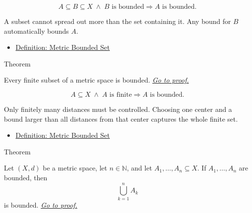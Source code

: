 \begin{remark*}
\[
A\subseteq B\subseteq X
\;\land\;
B\text{ is bounded}
\Longrightarrow
A\text{ is bounded}.
\]
\end{remark*}

\begin{remark*}[Interpretation]
A subset cannot spread out more than the set containing it.  Any bound for
\(B\) automatically bounds \(A\).
\end{remark*}

\begin{dependencies}
\begin{itemize}
  \item \hyperref[def:metric-bounded-set]{Definition: Metric Bounded Set}
\end{itemize}
\end{dependencies}

\begin{theorembox}{Theorem}
\begin{theorem}\label{thm:metric-finite-sets-bounded}
Every finite subset of a metric space is bounded.
\hyperref[prf:metric-finite-sets-bounded]{\textit{Go to proof.}}
\end{theorem}
\end{theorembox}

\begin{remark*}
\[
A\subseteq X
\;\land\;
A\text{ is finite}
\Longrightarrow
A\text{ is bounded}.
\]
\end{remark*}

\begin{remark*}[Interpretation]
Only finitely many distances must be controlled.  Choosing one center and a
bound larger than all distances from that center captures the whole finite
set.
\end{remark*}

\begin{dependencies}
\begin{itemize}
  \item \hyperref[def:metric-bounded-set]{Definition: Metric Bounded Set}
\end{itemize}
\end{dependencies}

\begin{theorembox}{Theorem}
\begin{theorem}
\label{thm:metric-finite-unions-bounded-sets-bounded}
Let \((X,d)\) be a metric space, let \(n\in\mathbb{N}\), and let
\(A_1,\ldots,A_n\subseteq X\).  If \(A_1,\ldots,A_n\) are bounded, then
\[
  \bigcup_{k=1}^n A_k
\]
is bounded.
\hyperref[prf:metric-finite-unions-bounded-sets-bounded]{\textit{Go to proof.}}
\end{theorem}
\end{theorembox}

